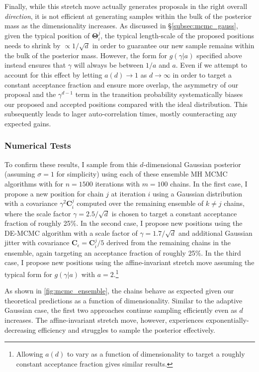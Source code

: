 \documentclass[12pt, titlepage]{article}
\newcommand{\params}{\ensuremath{\boldsymbol\Theta}}
\newcommand{\cov}{\ensuremath{\mathbf{C}}}
\begin{document}
Finally, while this stretch move actually generates proposals 
in the right overall \textit{direction}, it is not efficient at generating
samples within the bulk of the posterior mass
as the dimensionality increases.
As discussed in \S\ref{subsec:mcmc_gauss}, given the typical
position of $\params_i^j$, the typical length-scale of
the proposed positions needs to shrink by
$\propto 1/\sqrt{d}$ in order to guarantee our new sample
remains within the bulk of the posterior mass.
However, the form for $g(\gamma|a)$ specified above 
instead ensures that $\gamma$ will always be between $1/a$ and $a$.
Even if we attempt to account for this effect by letting 
$a(d) \rightarrow 1$ as $d \rightarrow \infty$ in order to
target a constant acceptance fraction and ensure more overlap, 
the asymmetry of our proposal and the $\gamma^{d-1}$ term
in the transition probability systematically biases our
proposed and accepted positions compared with the ideal distribution.
This subsequently leads to lager auto-correlation times, mostly
counteracting any expected gains.

\subsubsection*{Numerical Tests} \label{subsubsec:sims_2}

To confirm these results, I sample from this $d$-dimensional
Gaussian posterior (assuming $\sigma=1$ for simplicity) 
using each of these ensemble MH MCMC algorithms with for $n=1500$
iterations with $m=100$ chains.
In the first case, I propose a new position for chain $j$ 
at iteration $i$ using a Gaussian distribution with
a covariance $\gamma^2 \cov_i^j$ computed over the remaining ensemble of
$k \neq j$ chains, where the scale factor $\gamma=2.5/\sqrt{d}$ is
chosen to target a constant acceptance fraction of roughly 25\%. 
In the second case, I propose new positions using the DE-MCMC algorithm
with a scale factor of $\gamma=1.7/\sqrt{d}$ 
and additional Gaussian jitter with covariance $\cov_\epsilon = \cov_i^j / 5$
derived from the remaining chains in the ensemble, again targeting
an acceptance fraction of roughly 25\%.
In the third case, I propose new positions using the affine-invariant stretch
move assuming the typical form for $g(\gamma|a)$ with $a=2$.\footnote{Allowing
$a(d)$ to vary as a function of dimensionality to target a roughly constant
acceptance fraction gives similar results.}

As shown in {\color{red} \autoref{fig:mcmc_ensemble}}, the chains
behave as expected given our theoretical predictions as a function
of dimensionality. Similar to the adaptive Gaussian case,
the first two approaches continue 
sampling efficiently even as $d$ increases. The affine-invariant
stretch move, however, experiences exponentially-decreasing efficiency
and struggles to sample the posterior effectively.
\end{document}
